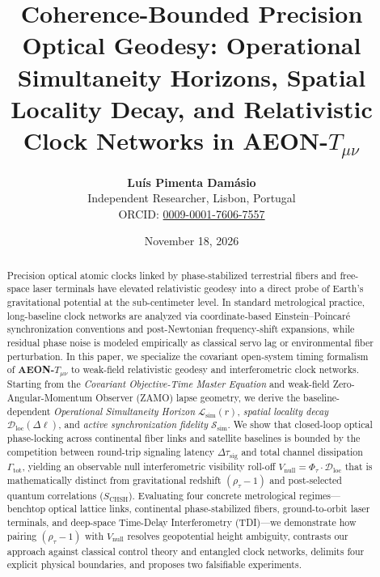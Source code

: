 \documentclass[11pt,a4paper]{article}
\title{\textbf{Coherence-Bounded Precision Optical Geodesy: Operational Simultaneity Horizons, Spatial Locality Decay, and Relativistic Clock Networks in AEON-$T_{\mu\nu}$}}
\author{
  \textbf{Luís Pimenta Damásio}\\
  Independent Researcher, Lisbon, Portugal\\
  ORCID: \href{https://orcid.org/0009-0001-7606-7557}{0009-0001-7606-7557}
}
\date{November 18, 2026}
\begin{document}
\maketitle

\begin{abstract}
\noindent Precision optical atomic clocks linked by phase-stabilized terrestrial fibers and free-space laser terminals have elevated relativistic geodesy into a direct probe of Earth's gravitational potential at the sub-centimeter level. In standard metrological practice, long-baseline clock networks are analyzed via coordinate-based Einstein--Poincaré synchronization conventions and post-Newtonian frequency-shift expansions, while residual phase noise is modeled empirically as classical servo lag or environmental fiber perturbation. In this paper, we specialize the covariant open-system timing formalism of \textbf{AEON-$T_{\mu\nu}$} to weak-field relativistic geodesy and interferometric clock networks. Starting from the \emph{Covariant Objective-Time Master Equation} and weak-field Zero-Angular-Momentum Observer (ZAMO) lapse geometry, we derive the baseline-dependent \emph{Operational Simultaneity Horizon} $\mathcal{L}_{\mathrm{sim}}(r)$, \emph{spatial locality decay} $\mathcal{D}_{\mathrm{loc}}(\Delta\ell)$, and \emph{active synchronization fidelity} $\mathcal{S}_{\mathrm{sim}}$. We show that closed-loop optical phase-locking across continental fiber links and satellite baselines is bounded by the competition between round-trip signaling latency $\Delta\tau_{\mathrm{sig}}$ and total channel dissipation $\Gamma_{\mathrm{tot}}$, yielding an observable null interferometric visibility roll-off $V_{\mathrm{null}} = \Phi_\tau \cdot \mathcal{D}_{\mathrm{loc}}$ that is mathematically distinct from gravitational redshift $(\rho_\tau - 1)$ and post-selected quantum correlations ($S_{\mathrm{CHSH}}$). Evaluating four concrete metrological regimes---benchtop optical lattice links, continental phase-stabilized fibers, ground-to-orbit laser terminals, and deep-space Time-Delay Interferometry (TDI)---we demonstrate how pairing $(\rho_\tau - 1)$ with $V_{\mathrm{null}}$ resolves geopotential height ambiguity, contrasts our approach against classical control theory and entangled clock networks, delimits four explicit physical boundaries, and proposes two falsifiable experiments.
\end{abstract}
\end{document}
